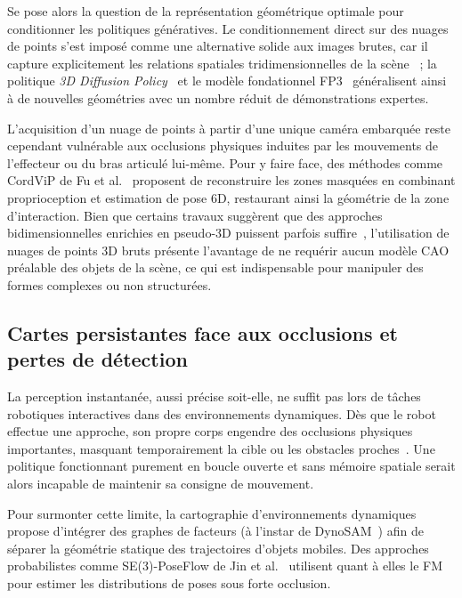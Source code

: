 Se pose alors la question de la représentation géométrique optimale pour conditionner les politiques génératives. Le conditionnement direct sur des nuages de points s'est imposé comme une alternative solide aux images brutes, car il capture explicitement les relations spatiales tridimensionnelles de la scène~\cite{Seita2022Toolflownet,Li2025Language} ; la politique \textit{3D Diffusion Policy}~\cite{Ze2024Diffusion} et le modèle fondationnel FP3~\cite{Yang2025Fp3} généralisent ainsi à de nouvelles géométries avec un nombre réduit de démonstrations expertes.

L'acquisition d'un nuage de points à partir d'une unique caméra embarquée reste cependant vulnérable aux occlusions physiques induites par les mouvements de l'effecteur ou du bras articulé lui-même. Pour y faire face, des méthodes comme CordViP de Fu et al.~\cite{Fu2025Cordvip} proposent de reconstruire les zones masquées en combinant proprioception et estimation de pose 6D, restaurant ainsi la géométrie de la zone d'interaction. Bien que certains travaux suggèrent que des approches bidimensionnelles enrichies en pseudo-3D puissent parfois suffire~\cite{Yu2025Need,Ni2025Semantic}, l'utilisation de nuages de points 3D bruts présente l'avantage de ne requérir aucun modèle \ac{CAO} préalable des objets de la scène, ce qui est indispensable pour manipuler des formes complexes ou non structurées.


\subsection{Cartes persistantes face aux occlusions et pertes de détection}
La perception instantanée, aussi précise soit-elle, ne suffit pas lors de tâches robotiques interactives dans des environnements dynamiques. Dès que le robot effectue une approche, son propre corps engendre des occlusions physiques importantes, masquant temporairement la cible ou les obstacles proches~\cite{Jones2025Beyond}. Une politique fonctionnant purement en boucle ouverte et sans mémoire spatiale serait alors incapable de maintenir sa consigne de mouvement.

Pour surmonter cette limite, la cartographie d'environnements dynamiques propose d'intégrer des graphes de facteurs (à l'instar de DynoSAM~\cite{Morris2025Dynosam}) afin de séparer la géométrie statique des trajectoires d'objets mobiles. Des approches probabilistes comme SE(3)-PoseFlow de Jin et al.~\cite{Jin2025Poseflow} utilisent quant à elles le \ac{FM} pour estimer les distributions de poses sous forte occlusion.

